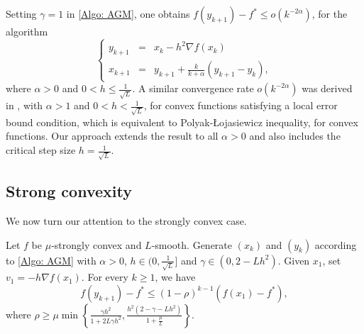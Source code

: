 \documentclass[onefignum,onetabnum]{siamart220329}
\begin{document}
\begin{remark}
Setting $\gamma=1$ in \eqref{Algo: AGM}, one obtains $f(y_{k+1}) - f^* \le o\left( k^{-2\alpha} \right)$, for the algorithm 
\begin{equation*}
\left\{\begin{array}{ccl}
y_{k+1} &=& x_k - h^2\nabla f(x_k) \\
x_{k+1} &=& y_{k+1} + \frac{k}{k+\alpha}\left( y_{k+1} - y_k \right),
\end{array}
\right.
\end{equation*}
where $\alpha>0$ and $0<h\le\frac{1}{\sqrt{L}}$. A similar convergence rate $o\left( k^{-2\alpha} \right)$ was derived in \cite{Liu_2024}, with $\alpha>1$ and $0<h<\frac{1}{\sqrt{L}}$, for convex functions satisfying a local error bound condition, which is equivalent to Polyak-\L ojasiewicz inequality, for convex functions. Our approach extends the result to all $\alpha>0$ and also includes the critical step size $h=\frac{1}{\sqrt{L}}$.     
\end{remark}




\subsection{Strong convexity}
We now turn our attention to the strongly convex case.

\begin{theorem} \label{T:grad_SC}
Let $f$ be $\mu$-strongly convex and $L$-smooth. Generate $(x_k)$ and $(y_k)$ according to \eqref{Algo: AGM} with $\alpha>0$, $h\in(0,\frac{1}{\sqrt{L}}]$ and $\gamma\in(0,2-Lh^2)$. Given $x_1$, set $v_1 = -h\nabla f(x_1)$. For every $k\ge 1$, we have
$$ f(y_{k+1}) - f^* \le \left( 1 - \rho \right)^{k-1} \left( f(x_1)-f^* \right), $$
where $\rho \ge \mu \min\left\{ \frac{\gamma h^2}{1 + 2L\gamma h^2},  \frac{h^2(2-\gamma - Lh^2)}{1+\frac{\mu}{L}} \right\}$.
\end{theorem}
\end{document}
